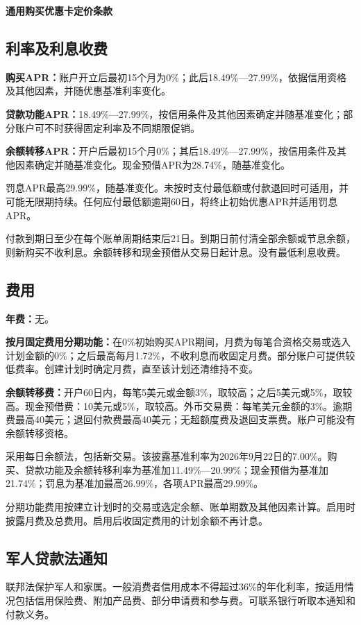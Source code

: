 \documentclass[UTF8,fontset=none,11pt,a4paper]{ctexart}
\begin{document}
{\noindent\fontsize{20}{25}\selectfont\bfseries 通用购买优惠卡定价条款\par}
\vspace{10pt}
\subsection*{利率及利息收费}
\textbf{购买APR：}账户开立后最初15个月为0\%；此后18.49\%—27.99\%，依据信用资格及其他因素，并随优惠基准利率变化。


\textbf{贷款功能APR：}18.49\%—27.99\%，按信用条件及其他因素确定并随基准变化；部分账户可不时获得固定利率及不同期限促销。


\textbf{余额转移APR：}开户后最初15个月0\%；其后18.49\%—27.99\%，按信用条件及其他因素确定并随基准变化。现金预借APR为28.74\%，随基准变化。


罚息APR最高29.99\%，随基准变化。未按时支付最低额或付款退回时可适用，并可能无限期持续。任何应付最低额逾期60日，将终止初始优惠APR并适用罚息APR。


付款到期日至少在每个账单周期结束后21日。到期日前付清全部余额或节息余额，则新购买不收利息。余额转移和现金预借从交易日起计息。没有最低利息收费。


\subsection*{费用}
\textbf{年费：}无。


\textbf{按月固定费用分期功能：}在0\%初始购买APR期间，月费为每笔合资格交易或选入计划金额的0\%；之后最高每月1.72\%，不收利息而收固定月费。部分账户可提供较低费率。创建计划时确定月费，直至该计划还清维持不变。


\textbf{余额转移费：}开户60日内，每笔5美元或金额3\%，取较高；之后5美元或5\%，取较高。现金预借费：10美元或5\%，取较高。外币交易费：每笔美元金额的3\%。逾期费最高40美元；退回付款费最高40美元；无超额度费及退回支票费。账户可能没有余额转移资格。


采用每日余额法，包括新交易。该披露基准利率为2026年9月22日的7.00\%。购买、贷款功能及余额转移利率为基准加11.49\%—20.99\%；现金预借为基准加21.74\%；罚息为基准加最高26.99\%，各项APR最高29.99\%。


分期功能费用按建立计划时的交易或选定余额、账单期数及其他因素计算。启用时披露月费及总费用。启用后收固定费用的计划余额不再计息。


\subsection*{军人贷款法通知}
联邦法保护军人和家属。一般消费者信用成本不得超过36\%的年化利率，按适用情况包括信用保险费、附加产品费、部分申请费和参与费。可联系银行听取本通知和付款义务。
\end{document}
